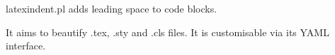 \begin{one}
latexindent.pl adds leading
space to code blocks.
\begin{two}
It aims to beautify .tex, .sty
and .cls files. It is customisable
via its YAML interface.
\end{two}
\end{one}
